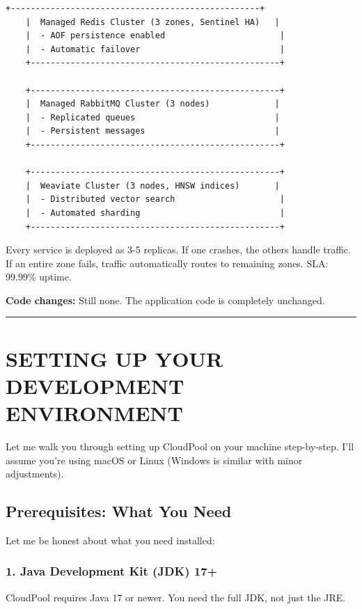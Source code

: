 \documentclass[11pt,a4paper]{report}
\begin{document}
\begin{lstlisting}[language=text]
    +--------------------------------------------------+
    |  Managed Redis Cluster (3 zones, Sentinel HA)   |
    |  - AOF persistence enabled                       |
    |  - Automatic failover                            |
    +--------------------------------------------------+
    
    +--------------------------------------------------+
    |  Managed RabbitMQ Cluster (3 nodes)             |
    |  - Replicated queues                            |
    |  - Persistent messages                          |
    +--------------------------------------------------+
    
    +--------------------------------------------------+
    |  Weaviate Cluster (3 nodes, HNSW indices)       |
    |  - Distributed vector search                     |
    |  - Automated sharding                            |
    +--------------------------------------------------+
\end{lstlisting}

Every service is deployed as 3-5 replicas. If one crashes, the others handle traffic. If an entire zone fails, traffic automatically routes to remaining zones. SLA: 99.99\% uptime.

\textbf{Code changes:} Still none. The application code is completely unchanged.


\vfill\hrule\vfill



\part{SETTING UP YOUR DEVELOPMENT ENVIRONMENT}


Let me walk you through setting up CloudPool on your machine step-by-step. I'll assume you're using macOS or Linux (Windows is similar with minor adjustments).


\chapter{Prerequisites: What You Need}


Let me be honest about what you need installed:


\section{1. Java Development Kit (JDK) 17+}


CloudPool requires Java 17 or newer. You need the full JDK, not just the JRE.
\end{document}
